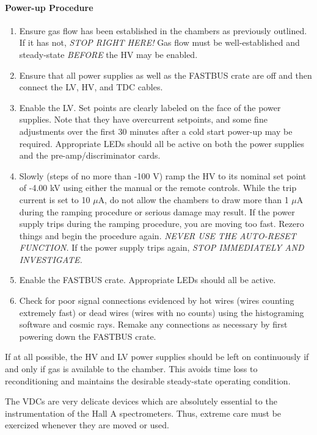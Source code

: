 \paragraph{Power-up Procedure}

\begin{enumerate}
\item {Ensure gas flow has been established in the chambers as
previously outlined.  If it has not, {\it STOP RIGHT
HERE!}  Gas flow must be well-established and steady-state
{\it BEFORE} the HV may be enabled.}
\item {Ensure that all power supplies as well as the FASTBUS crate
are off and then connect the LV, HV, and TDC cables.}
\item {Enable the LV.  Set points are clearly labeled on the face of
the power supplies.  Note that they have overcurrent setpoints, and
some fine adjustments over the first 30 minutes after a cold start
power-up may be required.  Appropriate LEDs should all be active on
both the power supplies and the pre-amp/discriminator cards.}
\item {Slowly (steps of no more than -100 V) ramp the HV to its
nominal set point of -4.00 kV using either the manual or the remote
controls.   While the trip current is set to 10 $\mu$A, do not allow
the chambers to draw more than 1 $\mu$A during the ramping procedure
or serious damage may result.  If the power supply trips during the
ramping procedure, you are moving too fast.  Rezero things and begin
the procedure again.  {\it NEVER USE THE AUTO-RESET FUNCTION.}}  If
the power supply trips again, {\it STOP IMMEDIATELY AND INVESTIGATE.}
\item {Enable the FASTBUS crate.  Appropriate LEDs should all be
active.}
\item {Check for poor signal connections evidenced by hot wires (wires
counting extremely fast) or dead wires (wires with no counts) using
the histograming software and cosmic rays.  Remake any connections as
necessary by first powering down the FASTBUS crate.}
\end{enumerate}

If at all possible, the HV and LV power supplies should be left
on continuously if and only if gas is available to the chamber.  This
avoids time loss to reconditioning and maintains the desirable
steady-state operating condition.


The VDCs are very delicate devices which are absolutely essential to
the instrumentation of the Hall A spectrometers.  Thus, extreme care
must be exercized whenever they are moved or used.

